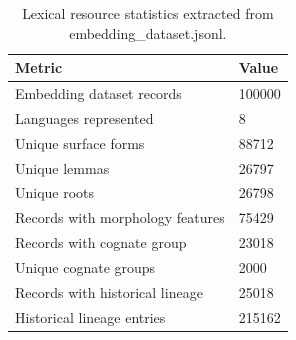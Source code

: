 \begin{table}[ht]
\centering
\caption{Lexical resource statistics extracted from embedding\_dataset.jsonl.}
\label{tab:lexical\_resource\_statistics}
\begin{tabular}{ll}
\hline
Metric & Value \\
\hline
Embedding dataset records & 100000 \\
Languages represented & 8 \\
Unique surface forms & 88712 \\
Unique lemmas & 26797 \\
Unique roots & 26798 \\
Records with morphology features & 75429 \\
Records with cognate group & 23018 \\
Unique cognate groups & 2000 \\
Records with historical lineage & 25018 \\
Historical lineage entries & 215162 \\
\hline
\end{tabular}
\end{table}
